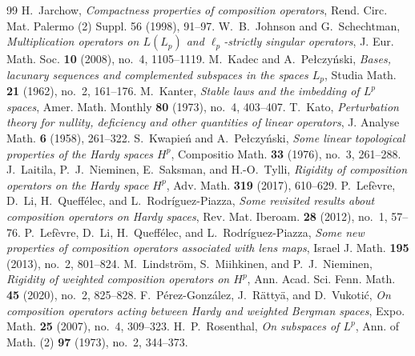 \documentclass[10pt,a4paper]{amsart}
\begin{document}
\begin{thebibliography}{99}
 H.~Jarchow, \textit{Compactness properties of composition operators}, Rend. Circ. Mat. Palermo (2) Suppl. 56 (1998), 91--97.
 W.~B.~Johnson and G.~Schechtman, \textit{Multiplication operators on \(L(L_p)\) and \(\ell_p\)-strictly singular operators}, J. Eur. Math. Soc. \textbf{10} (2008), no.~4, 1105--1119.
 M.~Kadec and A.~Pe{\l}czy\'nski, \textit{Bases, lacunary sequences and complemented subspaces in the spaces \(L_p\)}, Studia Math. \textbf{21} (1962), no.~2, 161--176.
 M.~Kanter, \textit{Stable laws and the imbedding of \(L^p\) spaces}, Amer. Math. Monthly \textbf{80} (1973), no.~4, 403--407.
 T.~Kato, \textit{Perturbation theory for nullity, deficiency and other quantities of linear operators}, J. Analyse Math. \textbf{6} (1958), 261--322.
 S.~Kwapie\'n and A.~Pe{\l}czy\'nski, \textit{Some linear topological properties of the Hardy spaces \(H^p\)}, Compositio Math. \textbf{33} (1976), no.~3, 261--288.
 J.~Laitila, P.~J.~Nieminen, E.~Saksman, and H.-O.~Tylli, \textit{Rigidity of composition operators on the Hardy space \(H^p\)}, Adv. Math. \textbf{319} (2017), 610--629.
 P.~Lef\`evre, D.~Li, H.~Queff\'elec, and L.~Rodr\'iguez-Piazza, \textit{Some revisited results about composition operators on Hardy spaces}, Rev. Mat. Iberoam. \textbf{28} (2012), no.~1, 57--76.
 P.~Lef\`evre, D.~Li, H.~Queff\'elec, and L.~Rodr\'iguez-Piazza, \textit{Some new properties of composition operators associated with lens maps}, Israel J. Math. \textbf{195} (2013), no.~2, 801--824.
 M.~Lindstr\"om, S.~Miihkinen, and P.~J.~Nieminen, \textit{Rigidity of weighted composition operators on \(H^p\)}, Ann. Acad. Sci. Fenn. Math. \textbf{45} (2020), no.~2, 825--828.
 F.~P\'erez-Gonz\'alez, J.~R\"atty\"a, and D.~Vukoti\'c, \textit{On composition operators acting between Hardy and weighted Bergman spaces}, Expo. Math. \textbf{25} (2007), no.~4, 309--323.
 H.~P.~Rosenthal, \textit{On subspaces of \(L^p\)}, Ann. of Math. (2) \textbf{97} (1973), no.~2, 344--373.

\end{thebibliography}
\end{document}
